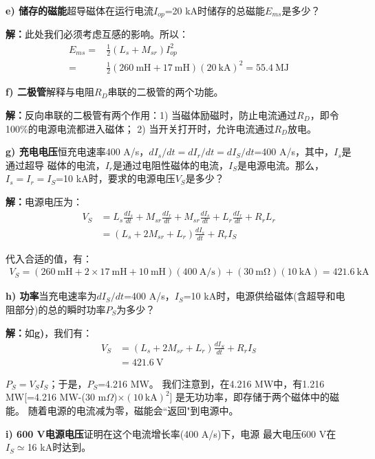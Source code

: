 \textbf{e) 储存的磁能}\qquad 超导磁体在运行电流$I_{op}$=20 kA时储存的总磁能$E_{ms}$是多少？

\textbf{解：}此处我们必须考虑互感的影响。所以：
\begin{align*}%
E_{ms}=&\frac{1}{2}(L_s+M_{sr})I_{op}^2\\
=&\frac{1}{2}(260\ \mathrm{mH}+17\ \mathrm{mH})(20\ \mathrm{kA})^2=55.4\ \mathrm{MJ}
\end{align*}

\textbf{f) 二极管}\qquad 解释与电阻$R_D$串联的二极管的两个功能。

\textbf{解：}反向串联的二极管有两个作用：1) 当磁体励磁时，防止电流通过$R_D$，即令100\%的电源电流都进入磁体；
2) 当开关打开时，允许电流通过$R_D$放电。

\textbf{g) 充电电压}\qquad 恒充电速率400 A/s，$dI_s/dt=dI_r/dt=dI_S/dt$=400 A/s，其中，$I_s$是通过超导
磁体的电流，$I_r$是通过电阻性磁体的电流，$I_S$是电源电流。那么，$I_s=I_r=I_S$=10 kA时，要求的电源电压$V_S$是多少？

\textbf{解：}电源电压为：
\begin{align*}%
V_S&=L_s\frac{dI_s}{dt}+M_{sr}\frac{dI_r}{dt}+M_{sr}\frac{dI_s}{dt}+L_r\frac{dI_r}{dt}+R_rL_r\\
&=(L_s+2M_{sr}+L_r)\frac{dI_s}{dt}+R_rI_S \tag{g.1}
\end{align*}

代入合适的值，有：
\begin{align*}%
V_S=(260\ \mathrm{mH}+2\times17\ \mathrm{mH}+10\ \mathrm{mH})(400\ \mathrm{A/s})+(30\ \mathrm{m\Omega})(10\ \mathrm{kA})=421.6\ \mathrm{kA}
\end{align*}

\textbf{h) 功率}\qquad 当充电速率为$dI_S/dt$=400 A/s，$I_S$=10 kA时，电源供给磁体(含超导和电阻部分)的总的瞬时功率$P_S$为多少？

\textbf{解：}如\textbf{g)}，我们有：
\begin{align*}%
V_S&=(L_s+2M_{sr}+L_r)\frac{dI_S}{dt}+R_rI_S\\ \tag{g.1}
&=421.6\ \mathrm{V}
\end{align*}

$P_S=V_S I_S$；于是，$P_S$=4.216 MW。
我们注意到，在4.216 MW中，有1.216 MW[=4.216 MW-(30 m$\Omega$)$\times(10\ \mathrm{kA})^2$]
是无功功率，即存储于两个磁体中的磁能。
随着电源的电流减为零，磁能会``返回"到电源中。

\textbf{i) 600 V电源电压}\qquad 证明在这个电流增长率(400 A/s)下，电源
最大电压600 V在$I_S\simeq$16 kA时达到。


